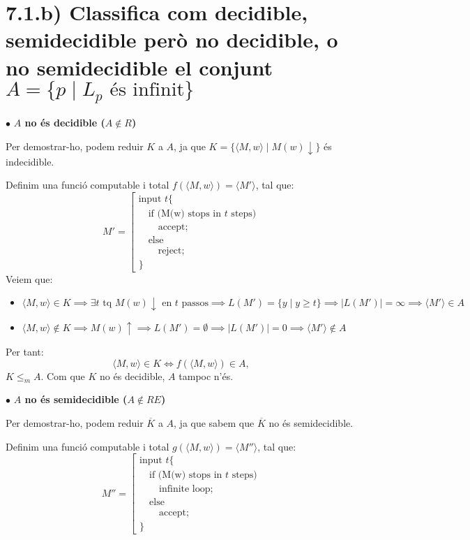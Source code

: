 \documentclass{article}
\begin{document}
\section*{\small 7.1.b) Classifica com decidible, semidecidible però no decidible, o no semidecidible el conjunt $ A = \{p \mid L_p \text{ és infinit} \} $}

$\bullet$ \textbf{$A$ no és decidible ($A \notin R$)}

Per demostrar-ho, podem reduir $K$ a $A$, ja que $K = \{\langle M,w\rangle \mid M(w)\downarrow\}$ és indecidible.

Definim una funció computable i total $f(\langle M,w \rangle) = \langle M'\rangle$, tal que:
\[
M' = \left[
\begin{array}{l}
\text{input } t \{ \\
\quad \text{if (M(w) stops in } t \text{ steps)} \\
\quad\quad \text{accept;} \\
\quad \text{else} \\
\quad\quad \text{reject;} \\
\}
\end{array}
\right.
\]
Veiem que:
\begin{itemize}
    \item $\langle M, w \rangle \in K \implies \exists t \text{ tq } M(w) \downarrow \text{ en } t \text{ passos} \implies L(M') = \{y \mid y \ge t\} \implies |L(M')| = \infty \implies \langle M' \rangle \in A$
    \item $ \langle M, w \rangle \notin K \implies M(w) \uparrow \implies L(M') = \emptyset \implies |L(M')| = 0 \implies \langle M' \rangle \notin A$
\end{itemize}
Per tant:
$$
\langle M,w\rangle \in K \iff f(\langle M,w\rangle) \in A,
$$
$K \leq_m A$. Com que $K$ no és decidible, $A$ tampoc n'és.

$\bullet$ \textbf{$A$ no és semidecidible ($A \notin RE$)}

Per demostrar-ho, podem reduir $\overline{K}$ a $A$, ja que sabem que $\overline{K}$ no és semidecidible.

Definim una funció computable i total $g(\langle M,w \rangle) = \langle M''\rangle$, tal que:
\[
M'' = \left[
\begin{array}{l}
\text{input } t \{ \\
\quad \text{if (M(w) stops in } t \text{ steps)} \\
\quad\quad \text{infinite loop;} \\
\quad \text{else} \\
\quad\quad \text{accept;} \\
\}
\end{array}
\right.
\]
\end{document}
